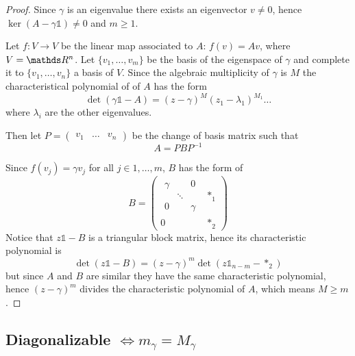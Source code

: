 \documentclass[12pt]{extarticle}
\numberwithin{equation}{section}
\begin{document}
\begin{proof}
	Since $\gamma$ is an eigenvalue there exists an eigenvector $v \neq 0$,
	hence $\ker (A - \gamma \mathds{1}) \ne 0$ and $m \geq 1$.

	Let $f: V \to V$ be the linear map associated to $A$: $f(v) = A v$, where $V = \R^n$.
	Let $\{v_1, \dots, v_m\}$ be the basis of the eigenspace of $\gamma$
	and complete it to $\{v_1, \dots, v_n\}$ a basis of $V$.
	Since the algebraic multiplicity of $\gamma$ is $M$
	the characteristical polynomial of of $A$ has the form
	\begin{equation}
		\det(\gamma \mathds{1} - A) = (z-\gamma)^M (z_1 - \lambda_1)^{M_1} \dots
	\end{equation}
	where $\lambda_i$ are the other eigenvalues.

	Then let $P = \begin{pmatrix}v_1 & \dots & v_n\end{pmatrix}$ be the change of basis matrix
	such that
	\begin{equation}
		A = P B P^{-1}
	\end{equation}

	Since $f(v_j) = \gamma v_j$ for all $j \in 1, \dots, m$, $B$ has the form of
	\begin{equation}
		B = \left(\begin{array}{c|c}
			\begin{matrix}
				\gamma &        & 0      \\
				       & \ddots &        \\
				0      &        & \gamma
			\end{matrix} & *_1          \\
			\hline
			0                           & *_2
		\end{array}
		\right)
	\end{equation}
	Notice that $z \mathds{1} - B$ is a triangular block matrix, hence its characteristic polynomial is
	\begin{equation}
		\det(z \mathds 1 - B) = (z-\gamma)^m \det(z \mathds 1_{n-m} - *_2)
	\end{equation}
	but since $A$ and $B$ are similar they have the same characteristic polynomial,
	hence $(z-\gamma)^m$ divides the characteristic polynomial of $A$,
	which means $M \geq m$.
\end{proof}

\subsection{Diagonalizable \texorpdfstring{$\iff m_\gamma = M_\gamma$}{iff geometric equals to algebraic}}
\end{document}
